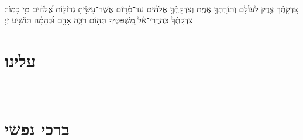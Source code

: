 \documentclass[twoside, openany, parskip=half, 11pt]{book}
\begin{document}
\shabbossimshalom

\tachanunim

\\
 צִ֭דְקָֽתְֿךָ צֶ֥דֶק לְעוֹ֗לָם וְתוֹרָֽתְךָ֥ אֱמֶֽת׃ וְצִדְקָֽתְֿךָ֥ אֱלֹהִ֗ים עַד־מָ֫ר֥וֹם אֲשֶׁר־עָשִׂ֥יתָ גְדוֹל֑וֹת אֱ֝לֹהִ֗ים מִ֣י כָמֽוֹךָ׃ צִדְקָֽתְֿךָ֙ כְּֽהַרֲרֵי־אֵ֗ל מִ֭שְׁפָּטֶיךָ תְּה֣וֹם רַבָּ֑ה אָדָ֥ם וּ֜בְהֵמָ֗ה תּוֹשִׁ֥יעַ יְיָ׃

\fullkaddish

\section*{ עלינו }

\aleinu

\\

\section[ברכי נפשי]{ ברכי נפשי }
\end{document}

